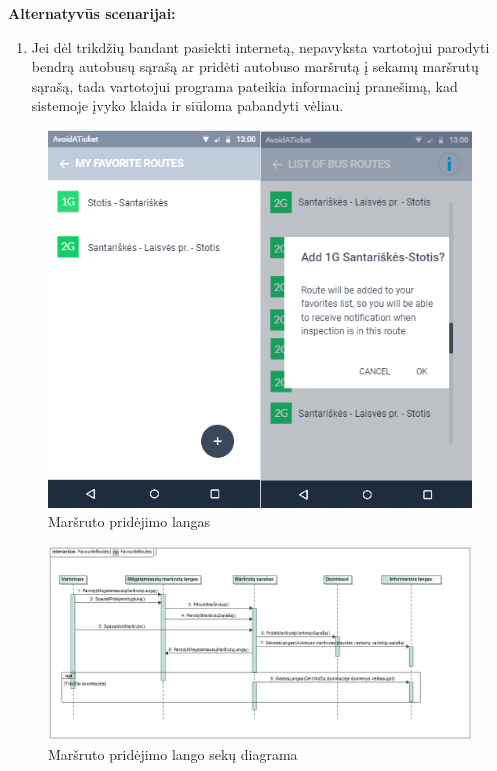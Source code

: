 \documentclass{VUMIFPSkursinis}
\begin{document}
	\textbf{Alternatyvūs scenarijai:}
	\begin{enumerate}[itemsep=-2mm]
		\item Jei dėl trikdžių bandant pasiekti internetą, nepavyksta vartotojui parodyti bendrą autobusų sąrašą ar pridėti autobuso maršrutą į sekamų maršrutų sąrašą, tada vartotojui programa pateikia informacinį pranešimą, kad sistemoje įvyko klaida ir siūloma pabandyti vėliau.
	\end{enumerate} 
		\begin{figure}[H]
				\centering
				\includegraphics[scale=1.5]{img/mockup_AddRoute}
				\caption{Maršruto pridėjimo langas}
				\label{img:Maršruto pridėjimo langas}
			\end{figure}
		\begin{figure}[H]
				\centering
				\includegraphics[scale=0.45]{img/FavouriteRoutesSequence}
				\caption{Maršruto pridėjimo lango sekų diagrama}
				\label{img:Maršruto pridėjimo langas RD}
			\end{figure}
\end{document}
